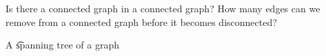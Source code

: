 

Is there a  connected graph in a connected graph?
How many edges can we remove from a connected graph before it becomes disconnected?


A \t{spanning tree of a graph}
